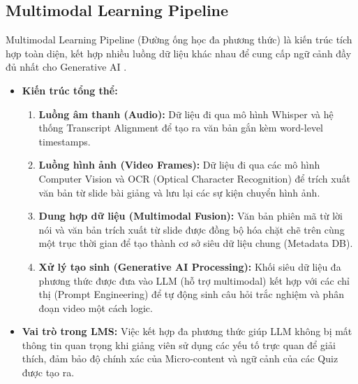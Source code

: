 \subsection{Multimodal Learning Pipeline}
Multimodal Learning Pipeline (Đường ống học đa phương thức) là kiến trúc tích hợp toàn diện, kết hợp nhiều luồng dữ liệu khác nhau để cung cấp ngữ cảnh đầy đủ nhất cho Generative AI \cite{baltrusaitis2018multimodal}.
\begin{itemize}
    \item \textbf{Kiến trúc tổng thể:}
    \begin{enumerate}
        \item \textbf{Luồng âm thanh (Audio):} Dữ liệu đi qua mô hình Whisper và hệ thống Transcript Alignment để tạo ra văn bản gắn kèm word-level timestamps.
        \item \textbf{Luồng hình ảnh (Video Frames):} Dữ liệu đi qua các mô hình Computer Vision và OCR (Optical Character Recognition) để trích xuất văn bản từ slide bài giảng và lưu lại các sự kiện chuyển hình ảnh.
        \item \textbf{Dung hợp dữ liệu (Multimodal Fusion):} Văn bản phiên mã từ lời nói và văn bản trích xuất từ slide được đồng bộ hóa chặt chẽ trên cùng một trục thời gian để tạo thành cơ sở siêu dữ liệu chung (Metadata DB).
        \item \textbf{Xử lý tạo sinh (Generative AI Processing):} Khối siêu dữ liệu đa phương thức được đưa vào LLM (hỗ trợ multimodal) kết hợp với các chỉ thị (Prompt Engineering) để tự động sinh câu hỏi trắc nghiệm và phân đoạn video một cách logic.
    \end{enumerate}
    \item \textbf{Vai trò trong LMS:} Việc kết hợp đa phương thức giúp LLM không bị mất thông tin quan trọng khi giảng viên sử dụng các yếu tố trực quan để giải thích, đảm bảo độ chính xác của Micro-content và ngữ cảnh của các Quiz được tạo ra.
\end{itemize}

